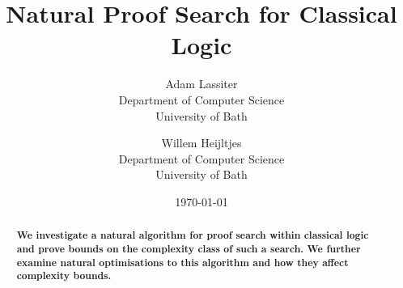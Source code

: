 \documentclass{article}
\title{Natural Proof Search for Classical Logic}
\author{Adam Lassiter\\Department of Computer Science\\University of Bath \and Willem Heijltjes\\Department of Computer Science\\University of Bath}
\date{\today}
\theoremstyle{indented}
\begin{document}
    \maketitle
    \begin{abstract}
        \textbf{
            We investigate a natural algorithm for proof search within classical logic and prove bounds on the complexity class of such a search.
            We further examine natural optimisations to this algorithm and how they affect complexity bounds.
        }
    \end{abstract}

    
 
    

    

    
    
\end{document}
